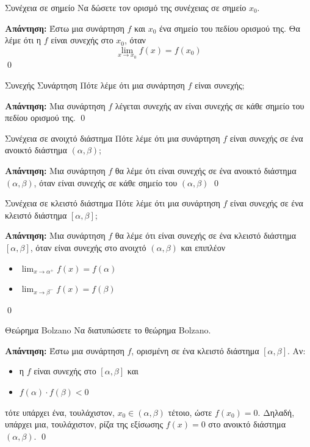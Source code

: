 \documentclass[a4paper, 12pt]{article}
\renewenvironment{proof}[1][\textbf{Απάντηση}]{%
  \par\noindent\textbf{#1:} \rmfamily}{\qed\par}
\begin{document}
\begin{theorem}{Συνέχεια σε σημείο}
  Να δώσετε τον ορισμό της συνέχειας σε σημείο $x_0$.
\end{theorem}
\begin{proof}
  Έστω μια συνάρτηση $f$ και $x_0$ ένα σημείο του πεδίου ορισμού της. Θα λέμε ότι η $f$ είναι συνεχής στο $x_0$, όταν
  $$\lim_{x \to x_0} f(x) = f(x_0)$$
\end{proof}

\begin{theorem}{Συνεχής Συνάρτηση}
  Πότε λέμε ότι μια συνάρτηση $f$ είναι συνεχής;
\end{theorem}
\begin{proof}
  Μια συνάρτηση $f$ λέγεται συνεχής αν είναι συνεχής σε κάθε σημείο του πεδίου ορισμού της.
\end{proof}

\begin{theorem}{Συνέχεια σε ανοιχτό διάστημα}
  Πότε λέμε ότι μια συνάρτηση $f$ είναι συνεχής σε ένα ανοικτό διάστημα  $(α, β)$;
\end{theorem}
\begin{proof}
  Μια συνάρτηση $f$ θα λέμε ότι είναι συνεχής σε ένα ανοικτό διάστημα $(α, β)$, όταν είναι συνεχής σε κάθε σημείο του $(α, β)$
\end{proof}

\begin{theorem}{Συνέχεια σε κλειστό διάστημα}
  Πότε λέμε ότι μια συνάρτηση $f$ είναι συνεχής σε ένα κλειστό διάστημα  $[α, β]$;
\end{theorem}
\begin{proof}
  Μια συνάρτηση $f$ θα λέμε ότι είναι συνεχής σε ένα κλειστό διάστημα $[α, β]$, όταν είναι συνεχής στο ανοιχτό $(α, β)$ και επιπλέον
  \begin{itemize}
    \item $\lim_{x \to α^+} f(x) = f(α)$
    \item $\lim_{x \to β^-} f(x) = f(β)$
  \end{itemize}
\end{proof}

\begin{theorem}{Θεώρημα Bolzano}
  Να διατυπώσετε το θεώρημα Bolzano.
\end{theorem}
\begin{proof}
  Έστω μια συνάρτηση $f$, ορισμένη σε ένα κλειστό διάστημα $[α, β]$. Αν:
  \begin{itemize}
    \item η $f$ είναι συνεχής στο $[α, β]$ και
    \item $f(α)\cdot f(β) < 0$
  \end{itemize}
  τότε υπάρχει ένα, τουλάχιστον, $x_0 \in (α,β )$ τέτοιο, ώστε $f(x_0) = 0$.
  Δηλαδή, υπάρχει μια, τουλάχιστον, ρίζα της εξίσωσης $f(x) = 0$ στο ανοικτό διάστημα $(α, β)$.
\end{proof}
\end{document}
